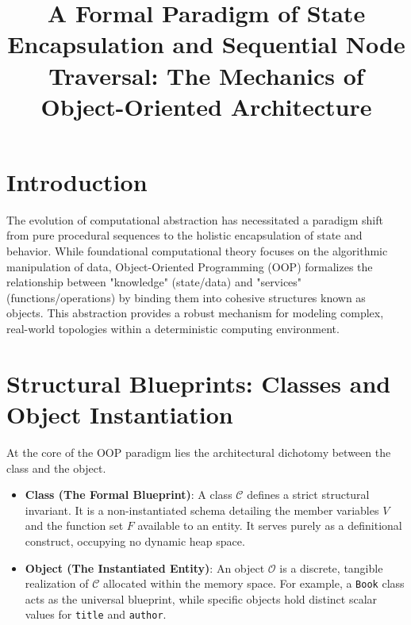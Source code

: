 \documentclass[10pt,journal,compsoc]{IEEEtran}
\begin{document}
\title{A Formal Paradigm of State Encapsulation and Sequential Node Traversal: The Mechanics of Object-Oriented Architecture}


\maketitle
\IEEEdisplaynontitleabstractindextext
\IEEEpeerreviewmaketitle


\section{Introduction}
The evolution of computational abstraction has necessitated a paradigm shift from pure procedural sequences to the holistic encapsulation of state and behavior. While foundational computational theory focuses on the algorithmic manipulation of data, Object-Oriented Programming (OOP) formalizes the relationship between "knowledge" (state/data) and "services" (functions/operations) by binding them into cohesive structures known as objects. This abstraction provides a robust mechanism for modeling complex, real-world topologies within a deterministic computing environment.

\section{Structural Blueprints: Classes and Object Instantiation}
At the core of the OOP paradigm lies the architectural dichotomy between the class and the object.
\begin{itemize}
\item \textbf{Class (The Formal Blueprint)}: A class $\mathcal{C}$ defines a strict structural invariant. It is a non-instantiated schema detailing the member variables $V$ and the function set $F$ available to an entity. It serves purely as a definitional construct, occupying no dynamic heap space.
\item \textbf{Object (The Instantiated Entity)}: An object $\mathcal{O}$ is a discrete, tangible realization of $\mathcal{C}$ allocated within the memory space. For example, a \texttt{Book} class acts as the universal blueprint, while specific objects hold distinct scalar values for \texttt{title} and \texttt{author}.
\end{itemize}
\end{document}
